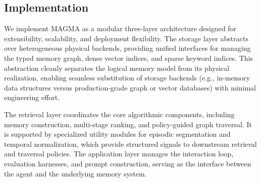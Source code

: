\documentclass[11pt]{article}
\begin{document}
\subsection{Implementation }
\label{sec:MAGMA:impl}
We implement MAGMA as a modular three-layer architecture designed for extensibility, scalability, and deployment flexibility. The storage layer abstracts over heterogeneous physical backends, providing unified interfaces for managing the typed memory graph, dense vector indices, and sparse keyword indices. This abstraction cleanly separates the logical memory model from its physical realization, enabling seamless substitution of storage backends (e.g., in-memory data structures versus production-grade graph or vector databases) with minimal engineering effort.

The retrieval layer coordinates the core algorithmic components, including memory construction, multi-stage ranking, and policy-guided graph traversal. It is supported by specialized utility modules for episodic segmentation and temporal normalization, which provide structured signals to downstream retrieval and traversal policies. The application layer manages the interaction loop, evaluation harnesses, and prompt construction, serving as the interface between the agent and the underlying memory system.




\begin{table}[t]
\centering
\small
\caption{Performance on the LoCoMo benchmark evaluated using the LLM-as-a-Judge metric. Higher scores indicate better performance. LLM model is based on gpt-4o-mini.}
\label{tab:locomo-main}

\end{table}
\end{document}
